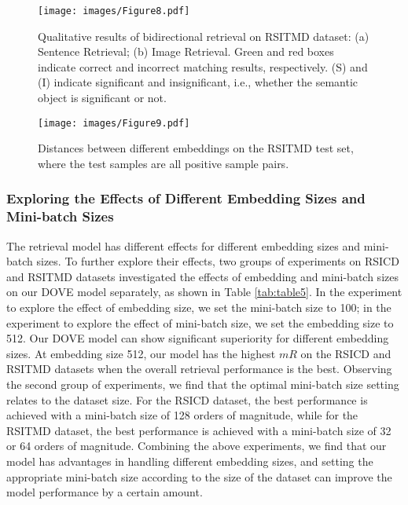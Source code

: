 \documentclass[journal]{IEEEtran}
\begin{document}
\begin{figure}[t]
  \centering
  \texttt{[image: images/Figure8.pdf]}
  \caption{Qualitative results of bidirectional retrieval on RSITMD dataset: (a) Sentence Retrieval; (b) Image Retrieval. Green and red boxes indicate correct and incorrect matching results, respectively. (S) and (I) indicate significant and insignificant, i.e., whether the semantic object is significant or not.}
  \label{fig:fig6}
\end{figure}

\begin{figure}[t]
  \centering
  \texttt{[image: images/Figure9.pdf]}
  \caption{Distances between different embeddings on the RSITMD test set, where the test samples are all positive sample pairs.}
  \label{fig:fig9}
\end{figure}

\subsubsection{Exploring the Effects of Different Embedding Sizes and Mini-batch Sizes}
The retrieval model has different effects for different embedding sizes and mini-batch sizes. To further explore their effects, two groups of experiments on RSICD and RSITMD datasets investigated the effects of embedding and mini-batch sizes on our DOVE model separately, as shown in Table \ref{tab:table5}. In the experiment to explore the effect of embedding size, we set the mini-batch size to 100; in the experiment to explore the effect of mini-batch size, we set the embedding size to 512. Our DOVE model can show significant superiority for different embedding sizes. At embedding size 512, our model has the highest $mR$ on the RSICD and RSITMD datasets when the overall retrieval performance is the best. Observing the second group of experiments, we find that the optimal mini-batch size setting relates to the dataset size. For the RSICD dataset, the best performance is achieved with a mini-batch size of 128 orders of magnitude, while for the RSITMD dataset, the best performance is achieved with a mini-batch size of 32 or 64 orders of magnitude. Combining the above experiments, we find that our model has advantages in handling different embedding sizes, and setting the appropriate mini-batch size according to the size of the dataset can improve the model performance by a certain amount.
\end{document}
